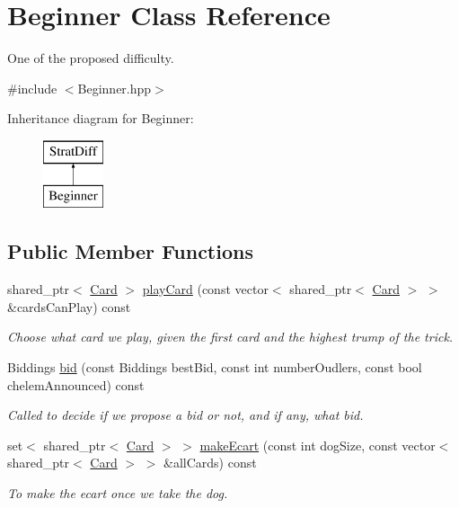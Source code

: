 \hypertarget{classBeginner}{\section{Beginner Class Reference}
\label{classBeginner}
}


One of the proposed difficulty.  




{\ttfamily \#include $<$Beginner.\-hpp$>$}

Inheritance diagram for Beginner\-:\begin{figure}[H]
\begin{center}
\leavevmode
\includegraphics[height=2.000000cm]{classBeginner}
\end{center}
\end{figure}
\subsection*{Public Member Functions}
\begin{DoxyCompactItemize}
\item 
shared\-\_\-ptr$<$ \hyperlink{classCard}{Card} $>$ \hyperlink{classBeginner_a73e2bf8d807166c994c42fd3b6bfc7bf}{play\-Card} (const vector$<$ shared\-\_\-ptr$<$ \hyperlink{classCard}{Card} $>$ $>$ \&cards\-Can\-Play) const 
\begin{DoxyCompactList}\small\item\em Choose what card we play, given the first card and the highest trump of the trick. \end{DoxyCompactList}\item 
Biddings \hyperlink{classBeginner_ad051797028f352b16df271fb24c435f6}{bid} (const Biddings best\-Bid, const int number\-Oudlers, const bool chelem\-Announced) const 
\begin{DoxyCompactList}\small\item\em Called to decide if we propose a bid or not, and if any, what bid. \end{DoxyCompactList}\item 
set$<$ shared\-\_\-ptr$<$ \hyperlink{classCard}{Card} $>$ $>$ \hyperlink{classBeginner_a7817d38e018ac5e1d9dbb42923ef0752}{make\-Ecart} (const int dog\-Size, const vector$<$ shared\-\_\-ptr$<$ \hyperlink{classCard}{Card} $>$ $>$ \&all\-Cards) const 
\begin{DoxyCompactList}\small\item\em To make the ecart once we take the dog. \end{DoxyCompactList}\end{DoxyCompactItemize}


